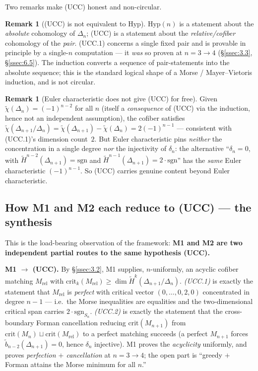 \documentclass[11pt,reqno]{amsart}
\theoremstyle{plain}
\theoremstyle{definition}
\newtheorem{remark}[theorem]{Remark}
\newcommand{\Hred}{\widetilde H}
\newcommand{\bred}{\widetilde b}
\newcommand{\chired}{\widetilde\chi}
\newcommand{\sgn}{\mathrm{sgn}}
\newcommand{\crit}{\mathrm{crit}}
\newcommand{\Mrel}{M_{\mathrm{rel}}}
\newcommand{\Hyp}{\mathrm{Hyp}}
\newcommand{\UCC}{\textup{(UCC)}}
\begin{document}
Two remarks make \UCC{} honest and non-circular.
\begin{remark}[\UCC{} is not equivalent to $\Hyp$]
$\Hyp(n)$ is a statement about the \emph{absolute} cohomology of
$\Delta_n$; \UCC{} is a statement about the \emph{relative/cofiber}
cohomology of the \emph{pair}. (UCC.1) concerns a single fixed pair and
is provable in principle by a single-$n$ computation --- it \emph{was}
so proven at $n=3\to4$ (\S\ref{ssec:3.3}, \S\ref{ssec:6.5}). The
induction converts a sequence of pair-statements into the absolute
sequence; this is the standard logical shape of a Morse / Mayer--Vietoris
induction, and is not circular.
\end{remark}
\begin{remark}[Euler characteristic does not give \UCC{} for free]
Given $\chired(\Delta_n)=(-1)^{n-2}$ for all $n$ (itself a
\emph{consequence} of \UCC{} via the induction, hence not an
independent assumption), the cofiber satisfies
$\chired(\Delta_{n+1}/\Delta_n)=\chired(\Delta_{n+1})-\chired(\Delta_n)
=2(-1)^{n-1}$ --- consistent with (UCC.1)'s dimension count~$2$. But
Euler characteristic pins \emph{neither} the concentration in a single
degree \emph{nor} the injectivity of $\delta_n$: the alternative
``$\delta_n=0$, with $\Hred^{n-2}(\Delta_{n+1})=\sgn$ and
$\Hred^{n-1}(\Delta_{n+1})=2\cdot\sgn$'' has the \emph{same} Euler
characteristic $(-1)^{n-1}$. So \UCC{} carries genuine content beyond
Euler characteristic.
\end{remark}

\subsection{How M1 and M2 each reduce to (UCC) --- the synthesis}\label{ssec:6.4}
This is the load-bearing observation of the framework:
\textbf{M1 and M2 are two independent partial routes to the same
hypothesis \UCC.}

\smallskip
\noindent\textbf{M1 $\longrightarrow$ \UCC.}
By \S\ref{ssec:3.2}, M1 supplies, $n$-uniformly, an acyclic cofiber
matching $\Mrel$ with
$\crit_k(\Mrel)\ge\dim\Hred^k(\Delta_{n+1}/\Delta_n)$. \emph{(UCC.1)} is
exactly the statement that $\Mrel$ is \emph{perfect} with critical
vector $(0,\dots,0,2,0)$ concentrated in degree $n-1$ --- i.e.\ the
Morse inequalities are equalities and the two-dimensional critical span
carries $2\cdot\sgn_{S_n}$. \emph{(UCC.2)} is exactly the statement that
the cross-boundary Forman cancellation reducing $\crit(M_{n+1})$ from
$\crit(M_n)\sqcup\crit(\Mrel)$ to a perfect matching succeeds (a perfect
$M_{n+1}$ forces $\bred_{n-2}(\Delta_{n+1})=0$, hence $\delta_n$
injective). M1 proves the \emph{acyclicity} uniformly, and proves
\emph{perfection $+$ cancellation} at $n=3\to4$; the open part is
``greedy $+$ Forman attains the Morse minimum for all $n$.''
\end{document}
